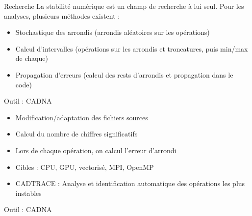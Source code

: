 \documentclass{beamer}
\begin{document}
  \begin{frame}{Recherche}
La stabilité numérique est un champ de recherche à lui seul. Pour les analyses, plusieurs méthodes existent : 
\begin{itemize}
\item Stochastique des arrondis (arrondis aléatoires sur les opérations)
\item Calcul d'intervalles (opérations sur les arrondis et troncatures, puis min/max de chaque)
\item Propagation d'erreurs (calcul des rests d'arrondis et propagation dans le code)
\end{itemize}
  \end{frame}
  
    \begin{frame}{Outil : CADNA}
    \begin{itemize}
    \item Modification/adaptation des fichiers sources
    \item Calcul du nombre de chiffres significatifs
    \item Lors de chaque opération, on calcul l'erreur d'arrondi
    \item Cibles : CPU, GPU, vectorisé, MPI, OpenMP
    \item CADTRACE : Analyse et identification automatique des opérations les plus instables
    \end{itemize}
  \end{frame}
  
  
  \begin{frame}{Outil : CADNA}
\cadnanosample
  \end{frame}
  
\end{document}
